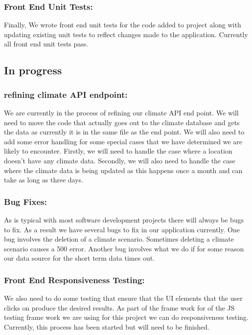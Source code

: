 \documentclass[onecolumn, draftclsnofoot,10pt, compsoc]{article}
\begin{document}
		\subsubsection{Front End Unit Tests:}
		Finally, We wrote front end unit tests for the code added to project along with updating existing unit tests to reflect changes made to the application. Currently all front end unit tests pass.
		
	\subsection{In progress}
		\subsubsection{refining climate API endpoint:}
		We are currently in the process of refining our climate API end point. We will need to move the code that actually goes out to the climate database and gets the data as currently it is in the same file as the end point. We will also need to add some error handling for some special cases that we have determined we are likely to encounter. Firstly, we will need to handle the case where a location doesn't have any climate data. Secondly, we will also need to handle the case where the climate data is being updated as this happens once a month and can take as long as three days.\\
		
		\subsubsection{Bug Fixes:}
		As is typical with most software development projects there will always be bugs to fix. As a result we have several bugs to fix in our application currently. One bug involves the deletion of a climate scenario. Sometimes deleting a climate scenario causes a 500 error. Another bug involves what we do if for some reason our data source for the short term data times out.\\
		
		\subsubsection{Front End Responsiveness Testing:}
		We also need to do some testing that ensure that the UI elements that the user clicks on produce the desired results. As part of the frame work for of the JS testing frame work we are using for this project we can do responsiveness testing. Currently, this process has been started but will need to be finished.\\
\end{document}
